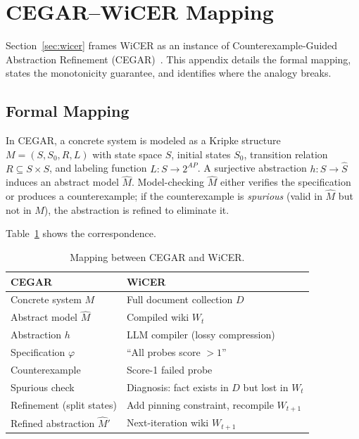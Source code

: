 \documentclass{article}
\begin{document}
\section{CEGAR--WiCER Mapping}
\label{app:cegar}

Section~\ref{sec:wicer} frames WiCER as an instance of
Counterexample-Guided Abstraction Refinement
(CEGAR)~\cite{clarke2000cegar}. This appendix details the formal mapping,
states the monotonicity guarantee, and identifies where the analogy
breaks.

\subsection*{Formal Mapping}

In CEGAR, a concrete system is modeled as a Kripke structure
$M = (S, S_0, R, L)$ with state space $S$, initial states $S_0$,
transition relation $R \subseteq S \times S$, and labeling function
$L : S \to 2^{AP}$. A surjective abstraction $h : S \to \hat{S}$
induces an abstract model $\hat{M}$. Model-checking $\hat{M}$ either
verifies the specification or produces a counterexample; if the
counterexample is \emph{spurious} (valid in $\hat{M}$ but not in $M$),
the abstraction is refined to eliminate it.

Table~\ref{tab:cegar_map} shows the correspondence.

\begin{table}[h]
\centering
\caption{Mapping between CEGAR and WiCER.}
\label{tab:cegar_map}
\small
\begin{tabular}{p{3.2cm}p{4.5cm}}
\toprule
\textbf{CEGAR} & \textbf{WiCER} \\
\midrule
Concrete system $M$ & Full document collection $D$ \\
Abstract model $\hat{M}$ & Compiled wiki $W_t$ \\
Abstraction $h$ & LLM compiler (lossy compression) \\
Specification $\varphi$ & ``All probes score $> 1$'' \\
Counterexample & Score-1 failed probe \\
Spurious check & Diagnosis: fact exists in $D$ but lost in $W_t$ \\
Refinement (split states) & Add pinning constraint, recompile $W_{t+1}$ \\
Refined abstraction $\hat{M}'$ & Next-iteration wiki $W_{t+1}$ \\
\bottomrule
\end{tabular}
\end{table}
\end{document}
